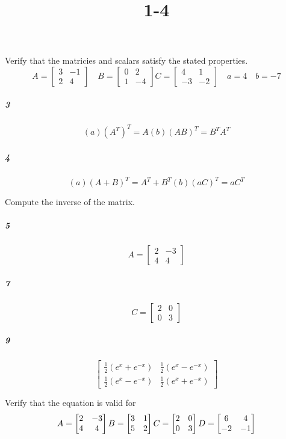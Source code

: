 \documentclass[fleqn]{article}
\title{1-4}
\begin{document}
\maketitle
\pagebreak
Verify that the matricies and scalars satisfy the stated properties. \[A = \begin{bmatrix} 3 & -1 \\ 2 & 4 \end{bmatrix}  \quad B = \begin{bmatrix} 0 & 2 \\ 1 & -4 \end{bmatrix} C = \begin{bmatrix} 4 & 1 \\ -3 & -2 \end{bmatrix}  \quad a = 4  \quad b = -7 \]

\subparagraph{3}

\[
(a) (A^T)^T = A (b) (AB)^T = B^T A^T
\]
\vfill



\subparagraph{4}

\[
(a) (A + B)^T = A^T + B^T (b) (aC)^T = aC^T
\]
\vfill


\pagebreak
 Compute the inverse of the matrix.

\subparagraph{5}

\[
A = \begin{bmatrix} 2 & -3 \\ 4 & 4 \end{bmatrix}
\]
\vfill



\subparagraph{7}

\[
C = \begin{bmatrix} 2 & 0 \\ 0 & 3 \end{bmatrix}
\]
\vfill


\pagebreak


\subparagraph{9}

\[
\begin{bmatrix} \frac{1}{2}(e^{x}+e^{-x}) & \frac{1}{2}(e^{x}-e^{-x})\\ \frac{1}{2}(e^{x}-e^{-x}) & \frac{1}{2}(e^{x}+e^{-x}) \end{bmatrix}
\]
\vfill

 Verify that the equation is valid for \[A = \begin{bmatrix} 2 & -3 \\ 4 & 4 \end{bmatrix} \\ B = \begin{bmatrix} 3 & 1 \\ 5 & 2 \end{bmatrix} \\ C = \begin{bmatrix} 2 & 0 \\ 0 & 3 \end{bmatrix} \\ D = \begin{bmatrix} 6 & 4 \\ -2 & -1 \end{bmatrix} \]
\end{document}

